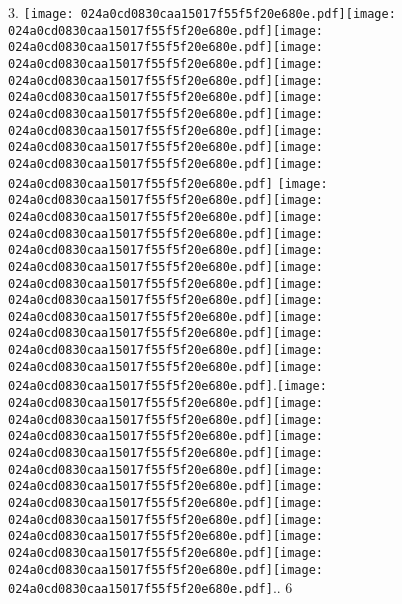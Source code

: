 \documentclass{article}
\newcommand{\origpg}[2]{\texttt{[image: 024a0cd0830caa15017f55f5f20e680e.pdf]}}
\begin{document}
{\vspace{19.754pt}\hspace{36.161pt} 

\vspace{0.626pt}\hspace{18.094pt}3. \origpg2{121.46pt 587.97pt 133.12pt 604.11pt}\origpg2{133.02pt 587.97pt 141.09pt 604.11pt}\origpg2{141.19pt 587.97pt 149.26pt 604.11pt}\hspace{-0.113pt}\origpg2{149.14pt 587.97pt 155.76pt 604.11pt}\hspace{-0.113pt}\origpg2{155.65pt 587.97pt 163.72pt 604.11pt}\origpg2{163.82pt 587.97pt 170.98pt 604.11pt}\origpg2{171.03pt 587.97pt 181.25pt 604.11pt}\origpg2{181.15pt 587.97pt 191.37pt 604.11pt}\origpg2{191.27pt 587.97pt 199.91pt 604.11pt}\origpg2{199.91pt 587.97pt 207.07pt 604.11pt}\hspace{-0.145pt}\origpg2{206.93pt 587.97pt 214.35pt 604.11pt} \origpg2{218.24pt 587.97pt 226.31pt 604.11pt}\origpg2{226.41pt 587.97pt 233.57pt 604.11pt}\origpg2{233.62pt 587.97pt 240.79pt 604.11pt}\hspace{0.291pt}\origpg2{241.08pt 587.97pt 249.13pt 604.11pt}\origpg2{249.04pt 587.97pt 257.67pt 604.11pt}\origpg2{257.67pt 587.97pt 264.05pt 604.11pt}\origpg2{263.97pt 587.97pt 271.13pt 604.11pt}\hspace{-0.178pt}\origpg2{270.96pt 587.97pt 279.59pt 604.11pt}\origpg2{279.59pt 587.97pt 288.23pt 604.11pt}\origpg2{288.29pt 587.97pt 295.71pt 604.11pt}\origpg2{295.7pt 587.97pt 311.85pt 604.11pt}\origpg2{311.85pt 587.97pt 327.99pt 604.11pt}.\hspace{-0.181pt}\origpg2{331.84pt 587.97pt 347.98pt 604.11pt}\origpg2{347.98pt 587.97pt 364.12pt 604.11pt}\hspace{-0.242pt}\origpg2{363.88pt 587.97pt 380.02pt 604.11pt}\origpg2{380.02pt 587.97pt 396.16pt 604.11pt}\origpg2{396.16pt 587.97pt 412.3pt 604.11pt}\origpg2{412.3pt 587.97pt 428.44pt 604.11pt}\hspace{-0.242pt}\origpg2{428.2pt 587.97pt 444.34pt 604.11pt}\origpg2{444.34pt 587.97pt 460.48pt 604.11pt}\origpg2{460.48pt 587.97pt 476.62pt 604.11pt}\hspace{-0.242pt}\origpg2{476.38pt 587.97pt 492.52pt 604.11pt}\origpg2{492.52pt 587.97pt 508.66pt 604.11pt}\origpg2{508.66pt 587.97pt 524.8pt 604.11pt}\hspace{-0.167pt}.. 6 

}
\end{document}
